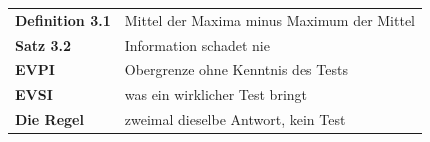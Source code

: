\begin{merksatz}
\begin{center}
\renewcommand{\arraystretch}{1.5}
\begin{tabular}{@{}P{3.0cm}P{5.6cm}@{}}
\toprule
\textbf{Definition 3.1} & Mittel der Maxima minus Maximum der Mittel\\
\textbf{Satz 3.2} & Information schadet nie\\
\textbf{EVPI} & Obergrenze ohne Kenntnis des Tests\\
\textbf{EVSI} & was ein wirklicher Test bringt\\
\textbf{Die Regel} & zweimal dieselbe Antwort, kein Test\\
\bottomrule
\end{tabular}
\end{center}

\begin{center}
\begin{minipage}{0.88\textwidth}
\end{minipage}
\end{center}
\end{merksatz}
